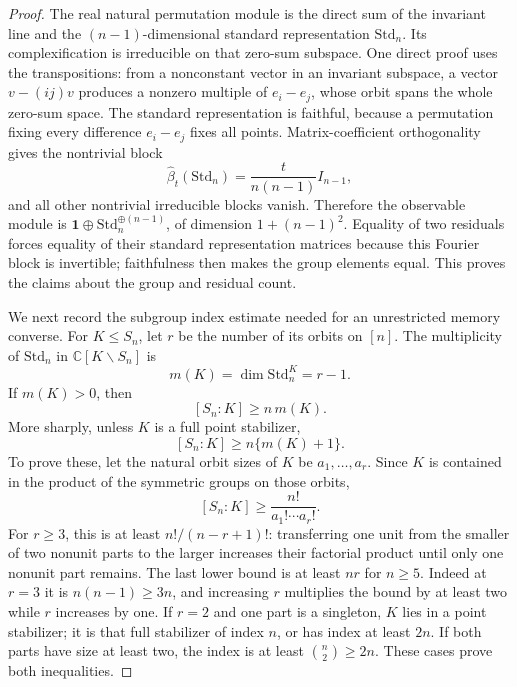 \begin{proof}
The real natural permutation module is the direct sum of the
invariant line and the $(n-1)$-dimensional standard representation
$\mathrm{Std}_n$. Its complexification is irreducible on that
zero-sum subspace. One direct proof uses the transpositions: from
a nonconstant vector in an invariant subspace, a vector
$v-(ij)v$ produces a nonzero multiple of $e_i-e_j$, whose orbit
spans the whole zero-sum space. The standard representation is
faithful, because a permutation fixing every difference $e_i-e_j$
fixes all points. Matrix-coefficient orthogonality gives the
nontrivial block
\[
 \widehat\beta_t(\mathrm{Std}_n)
   =\frac{t}{n(n-1)}I_{n-1},
\]
and all other nontrivial irreducible blocks vanish. Therefore the
observable module is
$\boldsymbol1\oplus\mathrm{Std}_n^{\oplus(n-1)}$, of dimension
$1+(n-1)^2$. Equality of two residuals forces equality of their
standard representation matrices because this Fourier block is
invertible; faithfulness then makes the group elements equal.
This proves the claims about the group and residual count.

We next record the subgroup index estimate needed for an unrestricted
memory converse. For $K\le S_n$, let $r$ be the number of its orbits
on $[n]$. The multiplicity of $\mathrm{Std}_n$ in
$\mathbb C[K\backslash S_n]$ is
\[
 m(K)=\dim\mathrm{Std}_n^K=r-1.
\]
If $m(K)>0$, then
\begin{equation}\label{eq:r75-index-estimate}
 [S_n:K]\ge n\,m(K).
\end{equation}
More sharply, unless $K$ is a full point stabilizer,
\begin{equation}\label{eq:r75-index-extra}
 [S_n:K]\ge n\{m(K)+1\}.
\end{equation}
To prove these, let the natural orbit sizes of $K$ be
$a_1,\ldots,a_r$. Since $K$ is contained in the product of the
symmetric groups on those orbits,
\[
 [S_n:K]\ge\frac{n!}{a_1!\cdots a_r!}.
\]
For $r\ge3$, this is at least $n!/(n-r+1)!$: transferring one
unit from the smaller of two nonunit parts to the larger increases
their factorial product until only one nonunit part remains. The
last lower bound is at least $nr$ for $n\ge5$. Indeed at $r=3$
it is $n(n-1)\ge3n$, and increasing $r$ multiplies the bound by
at least two while $r$ increases by one. If $r=2$ and one part
is a singleton, $K$ lies in a point stabilizer; it is that full
stabilizer of index $n$, or has index at least $2n$. If both
parts have size at least two, the index is at least
$\binom n2\ge2n$. These cases prove both inequalities.


\end{proof}
